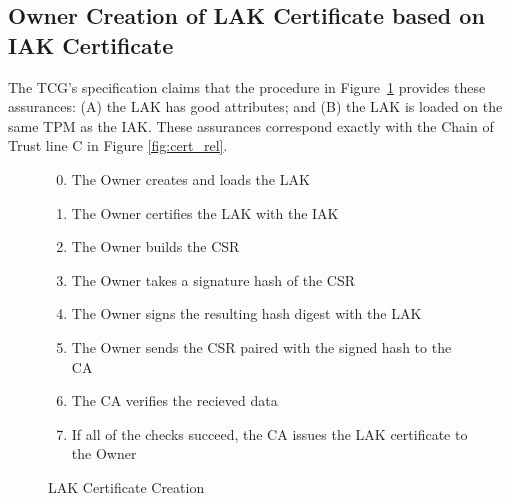 \documentclass[runningheads]{llncs}
\begin{document}
\subsection{Owner Creation of LAK Certificate based on IAK Certificate}

The TCG's specification claims that the procedure in
Figure~\ref{fig:lak-certificate-creation} provides
these assurances: (A) the LAK has good attributes; and (B) the LAK is
loaded on the same TPM as the IAK. These assurances correspond exactly
with the Chain of Trust line C in Figure \ref{fig:cert_rel}.

\begin{figure}[hpbt]
\begin{enumerate}[itemsep=0pt,parsep=0pt,partopsep=0pt]
  \setcounter{enumi}{-1}
  \item The Owner creates and loads the LAK
  \item The Owner certifies the LAK with the IAK
  \item The Owner builds the CSR%
  \item The Owner takes a signature hash of the CSR
  \item The Owner signs the resulting hash digest with the LAK
  \item The Owner sends the CSR paired with the signed hash to the CA
  \item The CA verifies the recieved data%
  \item If all of the checks succeed, the CA issues the LAK certificate to the Owner
  \end{enumerate}
  \caption{LAK Certificate Creation}
  \label{fig:lak-certificate-creation}
\end{figure}
\end{document}
